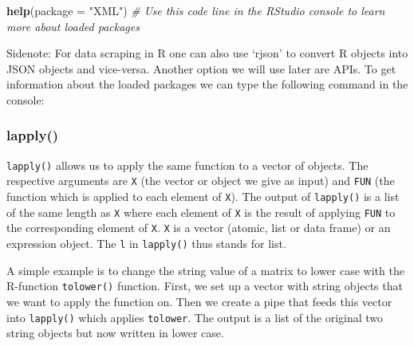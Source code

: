 \documentclass[
]{book}
\newenvironment{Shaded}{\begin{snugshade}}{\end{snugshade}}
\newcommand{\CommentTok}[1]{\textcolor[rgb]{0.56,0.35,0.01}{\textit{#1}}}
\newcommand{\DataTypeTok}[1]{\textcolor[rgb]{0.13,0.29,0.53}{#1}}
\newcommand{\KeywordTok}[1]{\textcolor[rgb]{0.13,0.29,0.53}{\textbf{#1}}}
\newcommand{\NormalTok}[1]{#1}
\newcommand{\OperatorTok}[1]{\textcolor[rgb]{0.81,0.36,0.00}{\textbf{#1}}}
\newcommand{\StringTok}[1]{\textcolor[rgb]{0.31,0.60,0.02}{#1}}
\begin{document}
\begin{Shaded}
\begin{Highlighting}[]
\KeywordTok{help}\NormalTok{(}\DataTypeTok{package =} \StringTok{"XML"}\NormalTok{) }\CommentTok{# Use this code line in the RStudio console to learn more about loaded packages}
\end{Highlighting}
\end{Shaded}

Sidenote: For data scraping in R one can also use `rjson' to convert R objects into JSON objects and vice-versa. Another option we will use later are APIs. To get information about the loaded packages we can type the following command in the console:

\hypertarget{lapply}{%
\subsubsection*{lapply()}\label{lapply}}

\texttt{lapply()} allows us to apply the same function to a vector of objects. The respective arguments are \texttt{X} (the vector or object we give as input) and \texttt{FUN} (the function which is applied to each element of \texttt{X}). The output of \texttt{lapply()} is a list of the same length as \texttt{X} where each element of \texttt{X} is the result of applying \texttt{FUN} to the corresponding element of \texttt{X}. \texttt{X} is a vector (atomic, list or data frame) or an expression object. The \texttt{l} in \texttt{lapply()} thus stands for list.

A simple example is to change the string value of a matrix to lower case with the R-function \texttt{tolower()} function. First, we set up a vector with string objects that we want to apply the function on. Then we create a pipe that feeds this vector into \texttt{lapply()} which applies \texttt{tolower}. The output is a list of the original two string objects but now written in lower case.

\begin{Shaded}
\end{Shaded}
\end{document}
